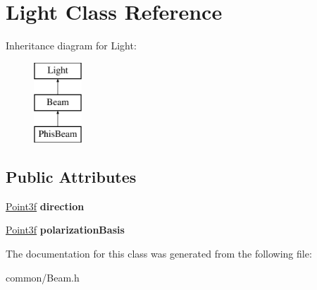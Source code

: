 \hypertarget{class_light}{}\section{Light Class Reference}
\label{class_light}
Inheritance diagram for Light\+:\begin{figure}[H]
\begin{center}
\leavevmode
\includegraphics[height=3.000000cm]{class_light}
\end{center}
\end{figure}
\subsection*{Public Attributes}
\begin{DoxyCompactItemize}
\item 
\mbox{\label{class_light_a91da59909da262125f2666e021540d91}} 
\mbox{\hyperlink{struct_point3f}{Point3f}} {\bfseries direction}
\item 
\mbox{\label{class_light_a7a8f39612eb3949f754817a5fe843ac5}} 
\mbox{\hyperlink{struct_point3f}{Point3f}} {\bfseries polarization\+Basis}
\end{DoxyCompactItemize}


The documentation for this class was generated from the following file\+:\begin{DoxyCompactItemize}
\item 
common/Beam.\+h\end{DoxyCompactItemize}
